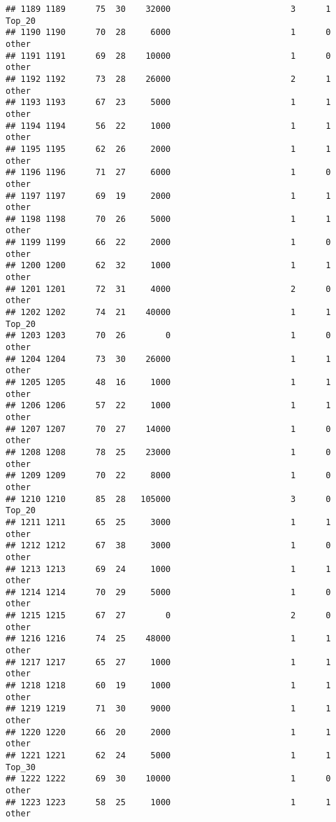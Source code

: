 \documentclass[
]{article}
\begin{document}
\begin{verbatim}
## 1189 1189      75  30    32000                        3      1   Top_20
## 1190 1190      70  28     6000                        1      0    other
## 1191 1191      69  28    10000                        1      0    other
## 1192 1192      73  28    26000                        2      1    other
## 1193 1193      67  23     5000                        1      1    other
## 1194 1194      56  22     1000                        1      1    other
## 1195 1195      62  26     2000                        1      1    other
## 1196 1196      71  27     6000                        1      0    other
## 1197 1197      69  19     2000                        1      1    other
## 1198 1198      70  26     5000                        1      1    other
## 1199 1199      66  22     2000                        1      0    other
## 1200 1200      62  32     1000                        1      1    other
## 1201 1201      72  31     4000                        2      0    other
## 1202 1202      74  21    40000                        1      1   Top_20
## 1203 1203      70  26        0                        1      0    other
## 1204 1204      73  30    26000                        1      1    other
## 1205 1205      48  16     1000                        1      1    other
## 1206 1206      57  22     1000                        1      1    other
## 1207 1207      70  27    14000                        1      0    other
## 1208 1208      78  25    23000                        1      0    other
## 1209 1209      70  22     8000                        1      0    other
## 1210 1210      85  28   105000                        3      0   Top_20
## 1211 1211      65  25     3000                        1      1    other
## 1212 1212      67  38     3000                        1      0    other
## 1213 1213      69  24     1000                        1      1    other
## 1214 1214      70  29     5000                        1      0    other
## 1215 1215      67  27        0                        2      0    other
## 1216 1216      74  25    48000                        1      1    other
## 1217 1217      65  27     1000                        1      1    other
## 1218 1218      60  19     1000                        1      1    other
## 1219 1219      71  30     9000                        1      1    other
## 1220 1220      66  20     2000                        1      1    other
## 1221 1221      62  24     5000                        1      1   Top_30
## 1222 1222      69  30    10000                        1      0    other
## 1223 1223      58  25     1000                        1      1    other

\end{verbatim}
\end{document}
